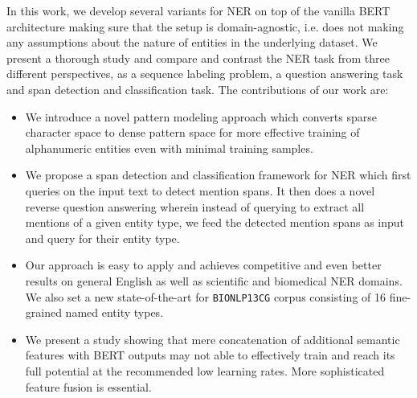     

In this work, we develop several variants for NER on top of the vanilla BERT architecture making sure that the setup is domain-agnostic, i.e. does not making any assumptions about the nature of entities in the underlying dataset. We present a thorough study and compare and contrast the NER task from three different perspectives, as a sequence labeling problem, a question answering task and span detection and classification task. The contributions of our work are:

\begin{itemize}
    \item We introduce a novel pattern modeling approach which converts sparse character space to dense pattern space for more effective training of alphanumeric entities even with minimal training samples.
    
    \item We propose a span detection and classification framework for NER which first queries on the input text to detect mention spans. It then does a novel reverse question answering wherein instead of querying to extract all mentions of a given entity type, we feed the detected mention spans as input and query for their entity type. 
    
    \item Our approach is easy to apply and achieves competitive and even better results on general English as well as scientific and biomedical NER domains. We also set a new state-of-the-art for \texttt{BIONLP13CG} corpus consisting of 16 fine-grained named entity types.
    
    \item We present a study showing that mere concatenation of additional semantic features with BERT outputs may not able to effectively train and reach its full potential at the recommended low learning rates. More sophisticated feature fusion is essential.
\end{itemize}

